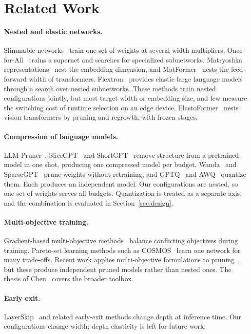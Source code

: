 \section{Related Work}
\label{sec:related}

\paragraph{Nested and elastic networks.}
Slimmable networks~\cite{yu2019slimmable,yu2019universally} train one set of weights at several width multipliers. Once-for-All~\cite{cai2020ofa} trains a supernet and searches for specialized subnetworks. Matryoshka representations~\cite{kusupati2022matryoshka} nest the embedding dimension, and MatFormer~\cite{devvrit2024matformer} nests the feed-forward width of transformers. Flextron~\cite{cai2024flextron} provides elastic large language models through a search over nested subnetworks. These methods train nested configurations jointly, but most target width or embedding size, and few measure the switching cost of runtime selection on an edge device. ElastoFormer~\cite{kalra2025elastoformer} nests vision transformers by pruning and regrowth, with frozen stages. 

\paragraph{Compression of language models.}
LLM-Pruner~\cite{ma2023llmpruner}, SliceGPT~\cite{ashkboos2024slicegpt} and ShortGPT~\cite{men2024shortgpt} remove structure from a pretrained model in one shot, producing one compressed model per budget. Wanda~\cite{sun2024wanda} and SparseGPT~\cite{frantar2023sparsegpt} prune weights without retraining, and GPTQ~\cite{frantar2023gptq} and AWQ~\cite{lin2024awq} quantize them. Each produces an independent model. Our configurations are nested, so one set of weights serves all budgets. Quantization is treated as a separate axis, and the combination is evaluated in Section~\ref{sec:design}.

\paragraph{Multi-objective training.}
Gradient-based multi-objective methods~\cite{sener2018mtl,yu2020pcgrad,liu2021cagrad,chen2025gradmoo,peitz2024moodl} balance conflicting objectives during training. Pareto-set learning methods such as COSMOS~\cite{ruchte2021cosmos} learn one network for many trade-offs. Recent work applies multi-objective formulations to pruning~\cite{chen2025mosp,afriat2026moonshot,ali2026structmoo}, but these produce independent pruned models rather than nested ones. The thesis of Chen~\cite{chen2026thesis} covers the broader toolbox. 

\paragraph{Early exit.}
LayerSkip~\cite{elhoushi2024layerskip} and related early-exit methods change depth at inference time. Our configurations change width; depth elasticity is left for future work.
